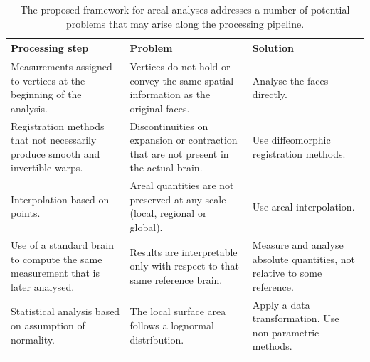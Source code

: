 \begin{table}[!p]
\caption[Problems solved by the proposed method.]{The proposed framework for areal analyses addresses a number of potential problems that may arise along the processing pipeline.}
\begin{center}
{\small
\begin{tabular}{@{}m{42mm}<{\raggedright}m{44mm}<{\raggedright}m{43mm}<{\raggedright}@{}}
\toprule
\textbf{Processing step} &
\textbf{Problem} &
\textbf{Solution} \\
\midrule
Measurements assigned to vertices at the beginning of the analysis. &
Vertices do not hold or convey the same spatial information as the original faces. &
Analyse the faces directly. \\
\midrule
Registration methods that not necessarily produce smooth and invertible warps. &
Discontinuities on expansion or contraction that are not present in the actual brain. &
Use diffeomorphic registration methods. \\
\midrule
Interpolation based on points. &
Areal quantities are not preserved at any scale (local, regional or global). &
Use areal interpolation. \\
\midrule
Use of a standard brain to compute the same measurement that is later analysed. &
Results are interpretable only with respect to that same reference brain. &
Measure and analyse absolute quantities, not relative to some reference. \\
\midrule
Statistical analysis based on assumption of normality. &
The local surface area follows a lognormal distribution. &
Apply a data transformation. Use non-parametric methods. \\
\bottomrule
\end{tabular}}
\end{center}
\label{tab:areal:compare}
\end{table}

